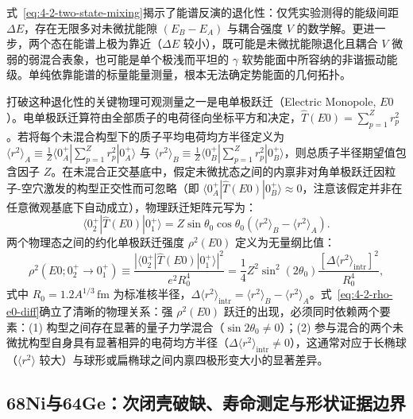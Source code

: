 式~\eqref{eq:4-2-two-state-mixing}揭示了能谱反演的退化性：仅凭实验测得的能级间距 $\Delta E$，存在无限多对未微扰能隙 $(E_B - E_A)$ 与耦合强度 $V$ 的数学解。更进一步，两个态在能谱上极为靠近（$\Delta E$ 较小），既可能是未微扰能隙退化且耦合 $V$ 微弱的弱混合表象，也可能是单个极浅而平坦的 $\gamma$ 软势能面中所容纳的非谐振动能级。单纯依靠能谱的标量能量测量，根本无法确定势能面的几何拓扑。

打破这种退化性的关键物理可观测量之一是电单极跃迁（Electric Monopole, $E0$）。电单极跃迁算符由全部质子的电荷径向坐标平方和决定，$\hat{T}(E0) = \sum_{p=1}^Z r_p^2$。若将每个未混合构型下的质子平均电荷均方半径定义为 $\langle r^2 \rangle_A \equiv \frac{1}{Z} \langle 0^+_A | \sum_{p=1}^Z r_p^2 | 0^+_A \rangle$ 与 $\langle r^2 \rangle_B \equiv \frac{1}{Z} \langle 0^+_B | \sum_{p=1}^Z r_p^2 | 0^+_B \rangle$，则总质子半径期望值包含因子 $Z$。在未混合正交基底中，假定未微扰态之间的内禀非对角单极跃迁因粒子-空穴激发的构型正交性而可忽略（即 $\langle 0^+_A | \hat{T}(E0) | 0^+_B \rangle \approx 0$，注意该假定并非在任意微观基底下自动成立），物理跃迁矩阵元写为：
\begin{equation}\label{eq:4-2-e0-matrix}
\langle 0^+_2 | \hat{T}(E0) | 0^+_1 \rangle = Z \sin\theta_0 \cos\theta_0 \left( \langle r^2 \rangle_B - \langle r^2 \rangle_A \right).
\end{equation}
两个物理态之间的约化单极跃迁强度 $\rho^2(E0)$ 定义为无量纲比值：
\begin{equation}\label{eq:4-2-rho-e0-diff}
\rho^2(E0; 0^+_2 \to 0^+_1) \equiv \frac{|\langle 0^+_2 | \hat{T}(E0) | 0^+_1 \rangle|^2}{e^2 R_0^4} = \frac{1}{4} Z^2 \sin^2(2\theta_0) \frac{\left[ \Delta\langle r^2 \rangle_{\mathrm{intr}} \right]^2}{R_0^4},
\end{equation}
式中 $R_0 = 1.2 A^{1/3}\,\mathrm{fm}$ 为标准核半径，$\Delta\langle r^2 \rangle_{\mathrm{intr}} = \langle r^2 \rangle_B - \langle r^2 \rangle_A$。式~\eqref{eq:4-2-rho-e0-diff}确立了清晰的物理关系：强 $\rho^2(E0)$ 跃迁的出现，必须同时依赖两个要素：(1) 构型之间存在显著的量子力学混合（$\sin 2\theta_0 \neq 0$）；(2) 参与混合的两个未微扰构型自身具有显著相异的电荷均方半径（$\Delta\langle r^2 \rangle_{\mathrm{intr}} \neq 0$），这通常对应于长椭球（$\langle r^2 \rangle$ 较大）与球形或扁椭球之间内禀四极形变大小的显著差异。

\subsection{68Ni与64Ge：次闭壳破缺、寿命测定与形状证据边界}\label{sec:4-2-2}


